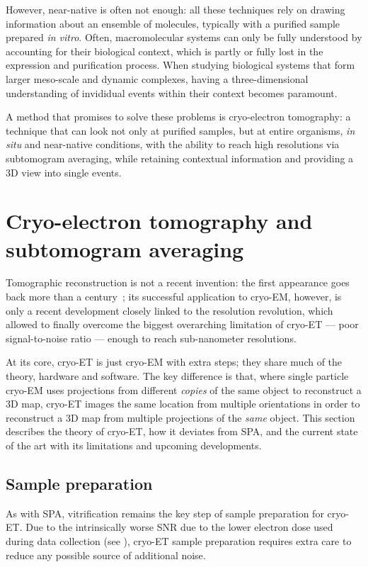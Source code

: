 However, near-native is often not enough: all these techniques rely on drawing information about an ensemble of molecules, typically with a purified sample prepared \textit{in vitro}.
Often, macromolecular systems can only be fully understood by accounting for their biological context, which is partly or fully lost in the expression and purification process.
When studying biological systems that form larger meso-scale and dynamic complexes, having a three-dimensional understanding of invididual events within their context becomes paramount.

A method that promises to solve these problems is cryo-electron tomography: a technique that can look not only at purified samples, but at entire organisms, \textit{in situ} and near-native conditions, with the ability to reach high resolutions via subtomogram averaging, while retaining contextual information and providing a 3D view into single events.


\section[Cryo-ET and STA]{Cryo-electron tomography and subtomogram averaging}

Tomographic reconstruction is not a recent invention: the first appearance goes back more than a century~\cite{jDeterminationFunctionsTheir1917}; its successful application to cryo-EM, however, is only a recent development closely linked to the resolution revolution, which allowed to finally overcome the biggest overarching limitation of cryo-ET --- poor signal-to-noise ratio --- enough to reach sub-nanometer resolutions.

At its core, cryo-ET is just cryo-EM with extra steps; they share much of the theory, hardware and software.
The key difference is that, where single particle cryo-EM uses projections from different \textit{copies} of the same object to reconstruct a 3D map, cryo-ET images the same location from multiple orientations in order to reconstruct a 3D map from multiple projections of the \textit{same} object.
This section describes the theory of cryo-ET, how it deviates from SPA, and the current state of the art with its limitations and upcoming developments.

\subsection{Sample preparation}
As with SPA, vitrification remains the key step of sample preparation for cryo-ET.
Due to the intrinsically worse SNR due to the lower electron dose used during data collection (see ), cryo-ET sample preparation requires extra care to reduce any possible source of additional noise.

